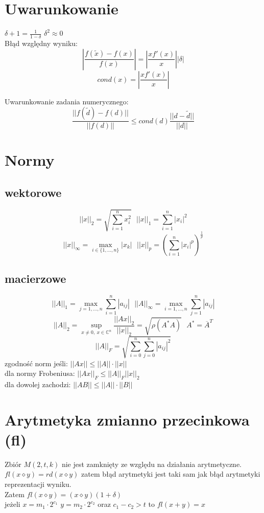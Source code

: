 \documentclass[10pt,twocolumn]{article}
\begin{document}
\begin{flushleft}
\section{Uwarunkowanie}
$\delta+1 = \frac{1}{1-\delta}$ $\delta^{2} \approx 0$\\
Błąd względny wyniku: $$\left| \frac{f(\widetilde{x}) - f(x)}{f(x)} \right| = \left| \frac{xf'(x)}{x} \right| |\delta|$$
$$cond(x) = \left| \frac{xf'(x)}{x} \right| $$

Uwarunkowanie zadania numerycznego: $$\frac{||f(\widetilde{d}) - f(d)||}{||f(d)||} \leq cond(d) \frac{||d - \widetilde{d}||}{||d||}$$
\section{Normy}
\subsection{wektorowe}
$$ ||x||_{2} = \sqrt{\sum_{i=1}^{n} x_{i}^{2}} \ \ \ ||x||_{1} = \sum_{i=1}^{n} |x_{i}|^{2} $$
$$ ||x||_{\infty} = \max_{i \in \{1,...,n\}} |x_{k}| \ \ \  ||x||_{p} = \left(\sum_{i=1}^{n}|x_{i}|^{p}\right)^{\frac{1}{p}} $$
\subsection{macierzowe}
$$ ||A||_{1} = \max_{j=1,...,n} \sum_{i=1}^{n}|a_{ij}| \ \ \ ||A||_{\infty} = \max_{i=1,...,n} \sum_{j=1}^{n}|a_{ij}| $$
$$\mathbb{}$$
$$ ||A||_{2} = \sup_{x \neq 0, \ x \in \mathbb{C}^{n}} \frac{||Ax||_{2}}{||x||_{2}} = \sqrt{\rho\left(A^{*}A\right)} \ \ \ A^{*} = \overline{A}^{T}$$
$$ ||A||_{F} = \sqrt{\sum_{i = 0}^{n} \sum_{j = 0}^{n} |a_{ij}|^{2}} $$
zgodność norm jeśli: $||Ax|| \leq ||A|| \cdot ||x||$\\
dla normy Frobeniusa: $||Ax||_{F} \leq ||A||_{F} ||x||_{2}$\\
dla dowolej zachodzi: $||AB|| \leq ||A|| \cdot ||B||$

\section{Arytmetyka zmianno przecinkowa (fl)}
Zbiór $M( 2,t,k )$ nie jest zamknięty ze względu na działania arytmetyczne. 
$fl(x \diamond y) = rd(x \diamond y)$ zatem błąd arytmetyki jest taki sam jak błąd arytmetyki reprezentacji wyniku.\\
Zatem $fl(x \diamond y) = (x \diamond y)(1 + \delta) $\\ jeżeli $x = m_{1}\cdot2^{c_{1}}$ $y = m_{2}\cdot2^{c_{2}}$ oraz $c_{1} -c_{2} > t$ to $fl(x+y) = x$


\end{flushleft}
\end{document}
